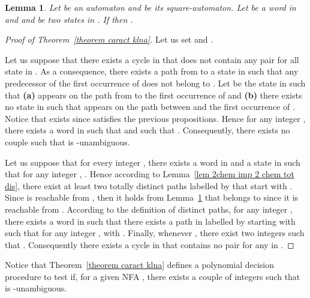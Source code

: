 \documentclass[11pt]{elsarticle}
\newtheorem{lemma}{Lemma}
\newcommand\modif[2]{{#2}}
\begin{document}
\begin{lemma}\label{lem q acc ds a qq acc ds car a}
  Let  be an automaton and  be its square-automaton. Let  be a word in  and  and  be two states in . If  then .
\end{lemma}
\modif{\begin{proof}
  By recurrence on the length of .
  
  If , since  and , the recurrence property holds.
  
  Let . Let us suppose that  and . Let . Hence . As a consequence, .
  
\end{proof}}{}

\begin{proof}[\modif{}{Proof of }Theorem~\ref{theorem caract klna}]
Let us set  and .
  
   Let us suppose that there exists a cycle  in  that does not contain any pair  for all state  in . As a consequence, there exists a path  from  to a state  in  such that any predecessor of the first occurrence of  does not belong to . Let  be the state in  such that \textbf{(a)}  appears on the path  from  to the first occurrence of  and \textbf{(b)} there exists no state  in  such that  appears on the path  between  and the first occurrence of . Notice that  exists since  satisfies the previous propositions. Hence for any integer , there exists a word  in  such that  and such that . Consequently, there exists no couple  such that  is -unambiguous.
  
   Let us suppose that for every integer , there exists a word  in  and a state  in  such that 
for any integer , . Hence according to Lemma~\ref{lem 2chem imp 2 chem tot dis}, there \modif{exists}{exist} at least two totally distinct paths labelled by  that start with . Since  is reachable from , then it holds from Lemma~\ref{lem q acc ds a qq acc ds car a} that  belongs to  since it is reachable from . According to the definition of distinct paths, for any integer , there exists a word in  such that there exists a path  in  labelled by  starting with  such that for any integer ,  with . Finally, whenever , there \modif{exists}{exist} two integers  such that . Consequently there exists a cycle in  that contains no pair  for any  in .  
  
  \end{proof}

Notice that Theorem~\ref{theorem caract klna} defines a polynomial decision procedure to test if, for a given NFA , there exists a couple  of integer\modif{}{s} such that  is -unambiguous.
\end{document}
